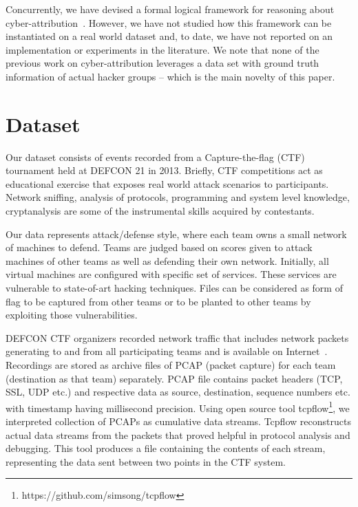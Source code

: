 \documentclass[conference]{IEEEtran}
\begin{document}
Concurrently,  we have devised a formal logical framework for reasoning about cyber-attribution~\cite{shakarian,shakarian14}.  However, we have not studied how this framework can be instantiated on a real world dataset and, to date, we have not reported on an implementation or experiments in the literature. We note that none of the previous work on cyber-attribution leverages a data set with ground truth information of actual hacker groups -- which is the main novelty of this paper. 


\section{Dataset}
\label{data}
Our dataset consists of events recorded from a Capture-the-flag (CTF) tournament held at DEFCON 21 in 2013. Briefly, CTF competitions act as educational exercise that exposes real world attack scenarios to participants. Network sniffing, analysis of protocols, programming and system level knowledge, cryptanalysis are some of the instrumental skills acquired by contestants. 

 Our data represents attack/defense style, where each team owns a small network of machines to defend. Teams are judged based on scores given to attack machines of other teams as well as defending their own network. Initially, all virtual machines are configured with specific set of services. These services are vulnerable to state-of-art hacking techniques. Files can be considered as form of flag to be captured from other teams or to be planted to other teams by exploiting those vulnerabilities.


DEFCON CTF organizers recorded network traffic that includes network packets generating to and from all participating teams and is available on Internet~\cite{pcap}. Recordings are stored as archive files of PCAP (packet capture) for each team (destination as that team) separately. PCAP file contains packet headers (TCP, SSL, UDP etc.) and respective data as source, destination, sequence numbers etc. with timestamp having millisecond precision. Using open source tool tcpflow\footnote{https://github.com/simsong/tcpflow}, we interpreted collection of PCAPs as cumulative data streams. Tcpflow reconstructs actual data streams from the packets that proved helpful in protocol analysis and debugging. 
This tool produces a file containing the contents of each stream, representing the data sent between two points in the CTF system. 
\end{document}
